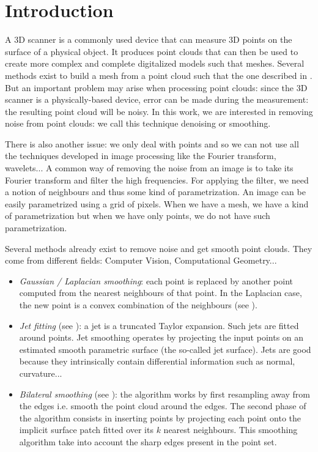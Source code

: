 \chapter{Introduction}

A 3D scanner is a commonly used device that can measure 3D points on the surface
of a physical object.  It produces point clouds that can then be used to create
more complex and complete digitalized models such that meshes. Several methods
exist to build a mesh from a point cloud such that the one described in
\cite{alexa2003computing}. But an important problem may arise when processing
point clouds: since the 3D scanner is a physically-based device, error can be
made during the measurement: the resulting point cloud will be noisy. In this
work, we are interested in removing noise from point clouds: we call this
technique denoising or smoothing.

There is also another issue: we only deal with points and so we can not use all
the techniques developed in image processing like the Fourier transform,
wavelets... A common way of removing the noise from an image is to take its
Fourier transform and filter the high frequencies. For applying the filter, we
need a notion of neighbours and thus some kind of parametrization. An image can
be easily parametrized using a grid of pixels.  When we have a mesh, we have a
kind of parametrization but when we have only points, we do not have such
parametrization.

Several methods already exist to remove noise and get smooth point clouds.
They come from different fields: Computer Vision, Computational Geometry...

\begin{itemize}
    \item \textit{Gaussian / Laplacian smoothing}: each point is replaced by
        another point computed from the nearest neighbours of that point. In
        the Laplacian case, the new point is a convex combination of the
        neighbours (see \cite{vollmer1999improved}).
    \item \textit{Jet fitting} (see \cite{cazals2005estimating}): a jet is a truncated
        Taylor expansion. Such jets are fitted around points. Jet smoothing
        operates by projecting the input points on an estimated smooth
        parametric surface (the so-called jet surface). Jets are good because
        they intrinsically contain differential information such as normal,
        curvature...
    \item \textit{Bilateral smoothing} (see \cite{huang2013edge}): the algorithm
        works by first resampling away from the edges i.e. smooth the point
        cloud around the edges. The second phase of the algorithm consists in
        inserting points by projecting each point onto the implicit surface
        patch fitted over its $ k $ nearest neighbours. This smoothing algorithm
        take into account the sharp edges present in the point set.
\end{itemize}


